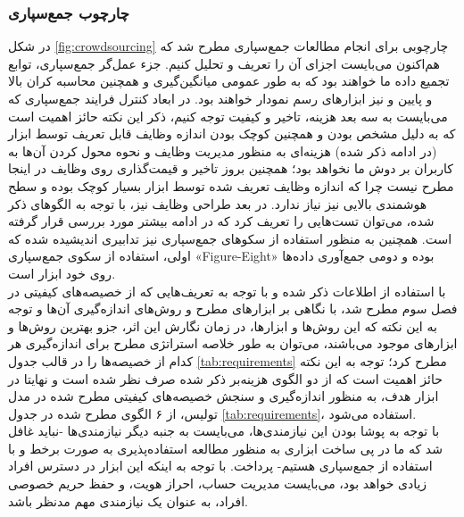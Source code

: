 \subsubsection{چارچوب جمع‌سپاری}
در شکل
\ref{fig:crowdsourcing}
چارچوبی برای انجام مطالعات جمع‌سپاری مطرح شد که هم‌اکنون می‌بایست اجزای آن را تعریف و تحلیل کنیم. جزء عمل‌گر جمع‌سپاری، توابع تجمیع داده ما خواهند بود که به طور عمومی میانگین‌گیری و همچنین محاسبه کران بالا و پایین و نیز ابزارهای رسم نمودار خواهند بود. در ابعاد کنترل فرایند جمع‌سپاری که می‌بایست به سه بعد هزینه، تاخیر و کیفیت توجه کنیم، ذکر این نکته حائز اهمیت است که به دلیل مشخص بودن و همچنین کوچک بودن اندازه وظایف قابل تعریف توسط ابزار (در ادامه ذکر شده) هزینه‌ای به منظور مدیریت وظایف و نحوه محول کردن آن‌ها به کاربران بر دوش ما نخواهد بود؛ همچنین بروز تاخیر و قیمت‌گذاری روی وظایف در اینجا مطرح نیست چرا که اندازه وظایف تعریف شده توسط ابزار بسیار کوچک بوده و سطح هوشمندی بالایی نیز نیاز ندارد. در بعد طراحی وظایف نیز، با توجه به الگوهای ذکر شده، می‌توان تست‌هایی را تعریف کرد که در ادامه بیشتر مورد بررسی قرار گرفته است. همچنین به منظور استفاده از سکوهای جمع‌سپاری نیز تدابیری اندیشیده شده که اولی، استفاده از سکوی جمع‌سپاری «Figure-Eight» بوده و دومی جمع‌آوری داده‌ها روی خود ابزار است.\\
با استفاده از اطلاعات ذکر شده و با توجه به تعریف‌هایی که از خصیصه‌های کیفیتی در فصل سوم مطرح شد، با نگاهی بر ابزارهای مطرح و روش‌های اندازه‌گیری آن‌ها و توجه به این نکته که این روش‌ها و ابزارها، در زمان نگارش این اثر، جزو بهترین روش‌ها
و ابزارهای موجود می‌باشند، می‌توان به طور خلاصه استراتژی مطرح برای اندازه‌گیری هر کدام از خصیصه‌ها را در قالب جدول
\ref{tab:requirements}
مطرح کرد؛ توجه به این نکته حائز اهمیت است که از دو الگوی هزینه‌بر ذکر شده صرف نظر شده است و نهایتا در ابزار هدف، به منظور اندازه‌گیری و سنجش خصیصه‌های کیفیتی مطرح شده در مدل تولیس، از ۶ الگوی مطرح شده در جدول
\ref{tab:requirements}،
استفاده می‌شود.\\
با توجه به پوشا بودن این نیازمندی‌ها، می‌بایست به جنبه دیگر نیازمندی‌ها -نباید غافل شد که ما در پی ساخت ابزاری به منظور مطالعه استفاده‌پذیری به صورت برخط و با استفاده از جمع‌سپاری هستیم- پرداخت. با توجه به اینکه این ابزار در دسترس افراد زیادی خواهد بود، می‌بایست مدیریت حساب، احراز هویت، و حفظ حریم خصوصی افراد، به عنوان یک نیازمندی مهم مدنظر باشد.\\
